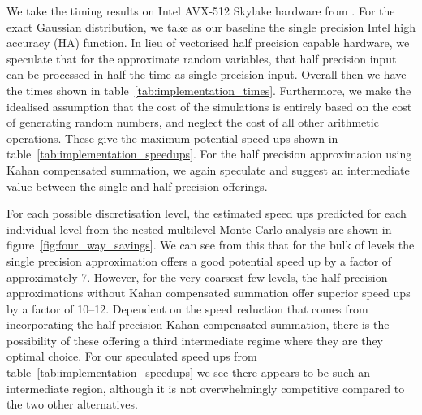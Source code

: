 \documentclass[manuscript,review]{acmart}
\begin{document}
We take the timing results on Intel AVX-512 Skylake hardware from \citet{giles2020approximating}. For the exact Gaussian distribution, we take as our baseline the single precision Intel high accuracy (HA) function. In lieu of vectorised half precision capable hardware, we speculate that for the approximate random variables, that half precision input can be processed in half the time as single precision input. Overall then we have the times shown in table~\ref{tab:implementation_times}. Furthermore, we make the idealised assumption that the cost of the simulations is entirely based on the cost of generating random numbers, and neglect the cost of all other arithmetic operations. These give the maximum potential speed ups shown in table~\ref{tab:implementation_speedups}. For the half precision approximation using Kahan compensated summation, we again speculate and suggest an intermediate value between the single and half precision offerings. 

For each possible discretisation level, the estimated speed ups predicted for each individual level from the nested multilevel Monte Carlo analysis are shown in figure~\ref{fig:four_way_savings}. We can see from this that for the bulk of levels the single precision approximation offers a good potential speed up by a factor of approximately 7. However, for the very coarsest few levels, the half precision approximations without Kahan compensated summation offer superior speed ups by a factor of 10--12. Dependent on the speed reduction that comes from incorporating the half precision Kahan compensated summation, there is the possibility of these offering a third intermediate regime where they are they optimal choice. For our speculated speed ups from table~\ref{tab:implementation_speedups} we see there appears to be such an intermediate region, although it is not overwhelmingly competitive compared to the two other alternatives. 
\end{document}
